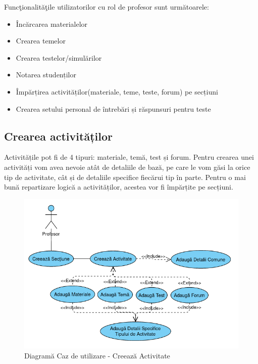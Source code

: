\documentclass[12pt, a4paper, oneside, romanian]{teza-upb}
\begin{document}
Funcţionalităţile utilizatorilor cu rol de profesor sunt următoarele:
\begin{itemize}
	\item Încărcarea materialelor
	\item Crearea temelor
	\item Crearea testelor/simulărilor
	\item Notarea studenților
	\item Împărțirea activităților(materiale, teme, teste, forum) pe secțiuni
	\item Crearea setului personal de întrebări și răspunsuri pentru teste
\end{itemize}

\subsection{Crearea activităților}

Activitățile pot fi de 4 tipuri: materiale, temă, test și forum. Pentru crearea unei activități vom avea nevoie atât de detaliile de bază, pe care le vom găsi la orice tip de activitate, cât și de detaliile specifice fiecărui tip în parte. Pentru o mai bună repartizare logică a activităților, acestea vor fi împărțite pe secțiuni.

\begin{figure}[H]
\centering
\includegraphics*[width=0.9\columnwidth]{diagrama-use-case-creeaza-activitate}
\caption{Diagramă Caz de utilizare - Creează Activitate}
\label{diagrama-use-case-creeaza-activitate}
\end{figure}
\end{document}
